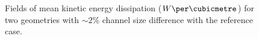 \begin{figure}[!h]
\centering
\caption{Fields of mean kinetic energy dissipation (${W\per\cubicmetre}$) for two geometries with $\sim2$\% channel size difference with the reference case.}
\label{fig:swirler_mod_phi}
\end{figure}

